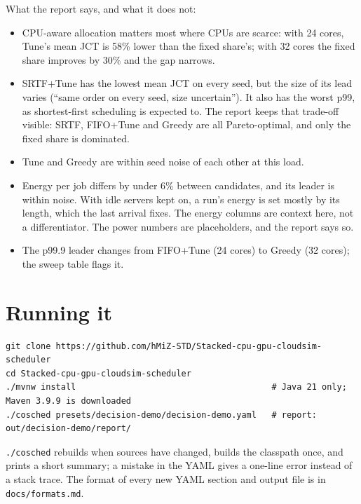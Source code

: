\documentclass[11pt,a4paper]{article}
\newcommand{\code}[1]{\texttt{#1}}
\begin{document}
What the report says, and what it does not:
\begin{itemize}
  \item CPU-aware allocation matters most where CPUs are scarce: with 24 cores, Tune's mean JCT is 58\% lower
        than the fixed share's; with 32 cores the fixed share improves by 30\% and the gap narrows.
  \item SRTF+Tune has the lowest mean JCT on every seed, but the size of its lead varies (``same order on every
        seed, size uncertain''). It also has the worst p99, as shortest-first scheduling is expected to. The
        report keeps that trade-off visible: SRTF, FIFO+Tune and Greedy are all Pareto-optimal, and only the fixed
        share is dominated.
  \item Tune and Greedy are within seed noise of each other at this load.
  \item Energy per job differs by under 6\% between candidates, and its leader is within noise. With idle servers
        kept on, a run's energy is set mostly by its length, which the last arrival fixes. The energy columns are
        context here, not a differentiator. The power numbers are placeholders, and the report says so.
  \item The p99.9 leader changes from FIFO+Tune (24 cores) to Greedy (32 cores); the sweep table flags it.
\end{itemize}

\section{Running it}

\begin{lstlisting}
git clone https://github.com/hMiZ-STD/Stacked-cpu-gpu-cloudsim-scheduler
cd Stacked-cpu-gpu-cloudsim-scheduler
./mvnw install                                       # Java 21 only; Maven 3.9.9 is downloaded
./cosched presets/decision-demo/decision-demo.yaml   # report: out/decision-demo/report/
\end{lstlisting}
\code{./cosched} rebuilds when sources have changed, builds the classpath once, and prints a short summary;
a mistake in the YAML gives a one-line error instead of a stack trace. The format of every new YAML section and
output file is in \code{docs/formats.md}.

\end{document}
